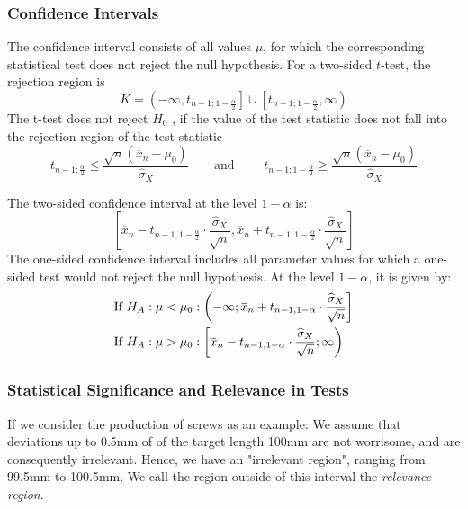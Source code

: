 \documentclass[11pt]{article}
\newcommand*\samplemean[1]{\overline{#1}}
\newcommand{\overbar}[1]{\mkern 1.5mu\overline{\mkern-1.5mu#1\mkern-1.5mu}\mkern 1.5mu}
\begin{document}
\subsubsection{Confidence Intervals}
The confidence interval consists of all values $\mu$, for which the corresponding statistical test does not reject the null hypothesis. For a two-sided $t$-test, the rejection region is
\begin{equation*}
	K = \left( -\infty, t_{n-1; 1-\frac{\alpha}{2}} \right] \cup \left[ t_{n-1; 1- \frac{\alpha}{2}}, \infty \right)
\end{equation*}
The t-test does not reject $H_0$ , if the value of the test statistic does not fall into the rejection region of the test statistic
\begin{equation*}
	t_{n-1; \frac{\alpha}{2}} \leq \frac{\sqrt{n}(\samplemean{x}_n - \mu_0)}{\widehat{\sigma}_X} \qquad	\text{and } \qquad
	t_{n-1; 1 - \frac{\alpha}{2}} \geq \frac{\sqrt{n}(\samplemean{x}_n - \mu_0)}{\widehat{\sigma}_X}
\end{equation*}

\begin{definition}
	The two-sided confidence interval at the level $1-\alpha$ is:
	\begin{equation*}
		\left[ \samplemean{x}_n - t_{n-1,1-\frac{\alpha}{2}}\cdot\frac{\widehat{\sigma}_X}{\sqrt{n}}, \samplemean{x}_n + t_{n-1,1-\frac{\alpha}{2}}\cdot\frac{\widehat{\sigma}_X}{\sqrt{n}} \right]
	\end{equation*}
	The one-sided confidence interval includes all parameter values for which a one-sided test would not reject the null hypothesis. At the level $1 - \alpha$, it is given by:
	\begin{align*}
		\text{If } H_A: \mu < \mu_0 &: \left(- \infty;\overbar{x}_n + t_{n-1,1-\alpha}\cdot \dfrac{\widehat{\sigma}_X}{\sqrt{n}} \right]\\
		\text{If } H_A: \mu > \mu_0 &: \left[\overbar{x}_n - t_{n-1,1-\alpha} \cdot \dfrac{\widehat{\sigma}_X}{\sqrt{n}};\infty \right)
	\end{align*}
\end{definition}

\subsubsection{Statistical Significance and Relevance in Tests}
If we consider the production of screws as an example: We assume that deviations
up to 0.5mm of of the target length 100mm are not worrisome, and are consequently
irrelevant. Hence, we have an "irrelevant region", ranging from 99.5mm to 100.5mm.
We call the region outside of this interval the \textit{relevance region}.
\end{document}
